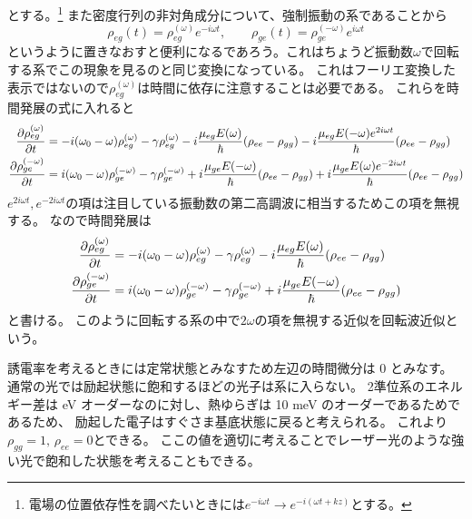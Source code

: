 \documentclass[11pt,dvipdfmx,a4paper]{jsarticle}
\begin{document}
とする。\footnote{電場の位置依存性を調べたいときには\(e^{-i\omega t} \rightarrow e^{-i(\omega t +kz)}\)とする。}
また密度行列の非対角成分について、強制振動の系であることから
\begin{equation}
	\rho_{eg}(t) = \rho_{eg}^{(\omega)} e^{-i\omega t}
	, \qquad \rho_{ge}(t) = \rho_{ge}^{(-\omega)} e^{ i\omega t}  \label{eq:rho_fourier}
\end{equation}
というように置きなおすと便利になるであろう。これはちょうど振動数\(\omega\)で回転する系でこの現象を見るのと同じ変換になっている。
これはフーリエ変換した表示ではないので\(\rho_{eg}^{(\omega)}\)は時間に依存に注意することは必要である。
これらを時間発展の式に入れると
\begin{align}
	\pdv{\rho_{eg}^{(\omega)}}{t}
	  &= -i(\omega_0-\omega)\rho_{eg}^{( \omega)} -\gamma\rho_{eg}^{( \omega)} -i\frac{\mu_{eg}E( \omega)}{\hbar}(\rho_{ee}-\rho_{gg})-i\frac{\mu_{eg}E(-\omega)e^{ 2i\omega t}}{\hbar}(\rho_{ee}-\rho_{gg})\\
	\pdv{\rho_{ge}^{(-\omega)}}{t}
	  &=  i(\omega_0-\omega)\rho_{ge}^{(-\omega)} -\gamma\rho_{ge}^{(-\omega)} +i\frac{\mu_{ge}E(-\omega)}{\hbar}(\rho_{ee}-\rho_{gg})+i\frac{\mu_{ge}E(\omega)e^{-2i\omega t}}{\hbar}(\rho_{ee}-\rho_{gg})
\end{align}
\(e^{2i\omega t}, e^{-2i\omega t}\)の項は注目している振動数の第二高調波に相当するためこの項を無視する。
なので時間発展は
\begin{align}
	\pdv{\rho_{eg}^{(\omega)}}{t}
	  &= -i(\omega_0-\omega)\rho_{eg}^{( \omega)} -\gamma\rho_{eg}^{( \omega)} -i\frac{\mu_{eg}E( \omega)}{\hbar}(\rho_{ee}-\rho_{gg})\\
	\pdv{\rho_{ge}^{(-\omega)}}{t}
	  &=  i(\omega_0-\omega)\rho_{ge}^{(-\omega)} -\gamma\rho_{ge}^{(-\omega)} +i\frac{\mu_{ge}E(-\omega)}{\hbar}(\rho_{ee}-\rho_{gg})
\end{align}
と書ける。
このように回転する系の中で\(2\omega \)の項を無視する近似を回転波近似という。

誘電率を考えるときには定常状態とみなすため左辺の時間微分は 0 とみなす。
通常の光では励起状態に飽和するほどの光子は系に入らない。
2準位系のエネルギー差は eV オーダーなのに対し、熱ゆらぎは 10 meV のオーダーであるためであるため、
励起した電子はすぐさま基底状態に戻ると考えられる。
これより\(\rho_{gg} = 1,\,\rho_{ee} = 0\)とできる。
ここの値を適切に考えることでレーザー光のような強い光で飽和した状態を考えることもできる。
\end{document}
